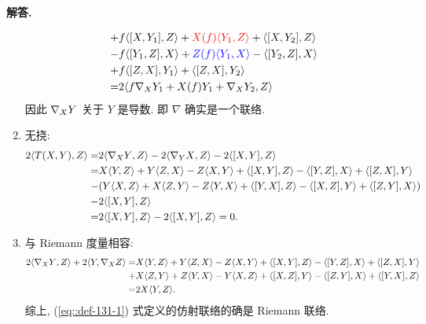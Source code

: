 \documentclass{ctexart}
\newenvironment{solution}{\par\noindent\textbf{解答. }}{\par}
\begin{document}
\begin{solution}
\begin{enumerate}
\[\begin{aligned}
                +& f\langle {[X, Y_1]}, {Z} \rangle + \textcolor{red}{X(f)\langle {Y_1}, {Z} \rangle} + \langle {[X, Y_2]}, {Z} \rangle \\
                -& f\langle {[Y_1, Z]}, {X} \rangle + \textcolor{blue}{Z(f)\langle {Y_1}, {X} \rangle} - \langle {[Y_2, Z]}, {X} \rangle \\
                +& f\langle {[Z, X]}, {Y_1} \rangle + \langle {[Z, X]}, {Y_2} \rangle \\
                =& 2\langle {f\nabla_{X}{Y_1} + X(f)Y_1 + \nabla_{X}{Y_2}}, {Z} \rangle
            \end{aligned}
        \]
        因此 $\nabla_{X}{Y}$ 关于 $Y$ 是导数. 即 $\nabla$ 确实是一个联络.
        \item 无挠:
        \[
            \begin{aligned}
                2\langle {T(X, Y)}, {Z} \rangle =& 2\langle {\nabla_{X}{Y}}, {Z} \rangle - 2\langle {\nabla_{Y}{X}}, {Z} \rangle - 2\langle {[X, Y]}, {Z} \rangle \\
                =& X\langle {Y}, {Z} \rangle + Y\langle {Z}, {X} \rangle - Z\langle {X}, {Y} \rangle + \langle {[X, Y]}, {Z} \rangle - \langle {[Y, Z]}, {X} \rangle + \langle {[Z, X]}, {Y} \rangle \\
                -& (Y\langle {X}, {Z} \rangle + X\langle {Z}, {Y} \rangle - Z\langle {Y}, {X} \rangle + \langle {[Y, X]}, {Z} \rangle - \langle {[X, Z]}, {Y} \rangle + \langle {[Z, Y]}, {X} \rangle) \\
                -& 2\langle {[X, Y]}, {Z} \rangle \\
                =& 2\langle {[X, Y]}, {Z} \rangle - 2\langle {[X, Y]}, {Z} \rangle = 0.
            \end{aligned}
        \]
        \item 与 Riemann 度量相容:
        \[
            \begin{aligned}
                2\langle {\nabla_{X}{Y}}, {Z} \rangle + 2\langle {Y}, {\nabla_{X}{Z}} \rangle 
                =& X\langle {Y}, {Z} \rangle + Y\langle {Z}, {X} \rangle - Z\langle {X}, {Y} \rangle + \langle {[X, Y]}, {Z} \rangle - \langle {[Y, Z]}, {X} \rangle + \langle {[Z, X]}, {Y} \rangle \\
                +& X\langle {Z}, {Y} \rangle + Z\langle {Y}, {X} \rangle - Y\langle {X}, {Z} \rangle + \langle {[X, Z]}, {Y} \rangle - \langle {[Z, Y]}, {X} \rangle + \langle {[Y, X]}, {Z} \rangle \\
                =& 2X\langle {Y}, {Z} \rangle.
            \end{aligned}
        \]
        综上, (\ref{eq::def-131-1}) 式定义的仿射联络的确是 Riemann 联络.
    \end{enumerate}
\end{solution}
\end{document}
